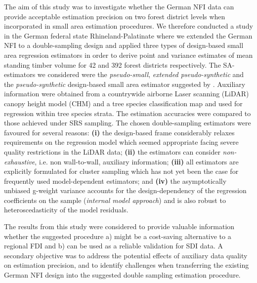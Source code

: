 The aim of this study was to investigate whether the German NFI data can provide acceptable estimation precision on two forest district levels when incorporated in small area estimation procedures. We therefore conducted a study in the German federal state Rhineland-Palatinate where we extended the German NFI to a double-sampling design and applied three types of design-based small area regression estimators in order to derive point and variance estimates of mean standing timber volume for 42 and 392 forest districts respectively. The SA-estimators we considered were the \textit{pseudo-small}, \textit{extended pseudo-synthetic} and the \textit{pseudo-synthetic} design-based small area estimator suggested by \citet{mandallaz2013a, mandallaz2013b}. Auxiliary information were obtained from a countrywide airborne Laser scanning (LiDAR) canopy height model (CHM) and a tree species classification map and used for regression within tree species strata. The estimation accuracies were compared to those achieved under SRS sampling. The chosen double-sampling estimators were favoured for several reasons: \textbf{(i)} the design-based frame considerably relaxes requirements on the regression model which seemed appropriate facing severe quality restrictions in the LiDAR data; \textbf{(ii)} the estimators can consider \textit{non-exhaustive}, i.e. non wall-to-wall, auxiliary information; \textbf{(iii)} all estimators are explicitly formulated for cluster sampling which has not yet been the case for frequently used model-dependent estimators; and \textbf{(iv)} the asymptotically unbiased g-weight variance accounts for the design-dependency of the regression coefficients on the sample (\textit{internal model approach}) and is also robust to heteroscedasticity of the model residuals.\par

The results from this study were considered to provide valuable information whether the suggested procedure a) might be a cost-saving alternative to a regional FDI and b) can be used as a reliable validation for SDI data. A secondary objective was to address the potential effects of auxiliary data quality on estimation precision, and to identify challenges when transferring the existing German NFI design into the suggested double sampling estimation procedure.



